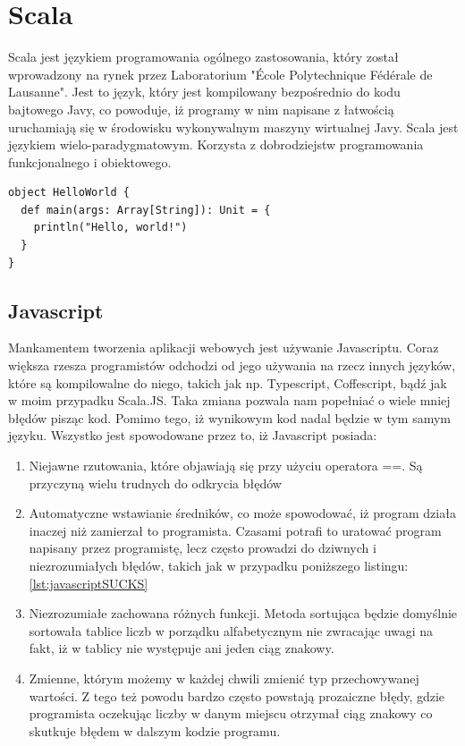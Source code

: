 \newpage
{\let\cleardoublepage\relax \chapter{Scala\cite{ScalaWiki}}}

Scala jest językiem programowania ogólnego zastosowania, który został wprowadzony na rynek przez Laboratorium "École Polytechnique Fédérale de Lausanne". Jest to język, który jest kompilowany bezpośrednio do kodu bajtowego Javy, co powoduje, iż programy w nim napisane z łatwością uruchamiają się w środowisku wykonywalnym maszyny wirtualnej Javy. 
Scala jest językiem wielo-paradygmatowym\cite{ScalaTour}. Korzysta z dobrodziejstw programowania funkcjonalnego i obiektowego.

\begin{lstlisting}[frame=single, numbers=none,captionpos=b, 
caption={Hello world napisany w języku Scala.}]
object HelloWorld {
  def main(args: Array[String]): Unit = {
    println("Hello, world!")
  }
}
\end{lstlisting}

\section{Javascript}

Mankamentem tworzenia aplikacji webowych jest używanie Javascriptu. Coraz większa rzesza programistów odchodzi od jego używania na rzecz innych języków, które są kompilowalne do niego, takich jak np. Typescript, Coffescript, bądź jak w moim przypadku Scala.JS. Taka zmiana pozwala nam popełniać o wiele mniej błędów pisząc kod. Pomimo tego, iż wynikowym kod nadal będzie w tym samym języku.
Wszystko jest spowodowane przez to, iż Javascript posiada:
\begin{enumerate}
	\item Niejawne rzutowania, które objawiają się przy użyciu operatora ==. Są przyczyną wielu trudnych do odkrycia błędów
	\item Automatyczne wstawianie średników, co może spowodować, iż program działa inaczej niż zamierzał to programista. Czasami potrafi to uratować program napisany przez programistę, lecz często prowadzi do dziwnych i niezrozumiałych błędów, takich jak w przypadku poniższego listingu: \ref{lst:javascriptSUCKS}
	\item Niezrozumiałe zachowana różnych funkcji. Metoda sortująca będzie domyślnie sortowała tablice liczb w porządku alfabetycznym nie zwracając uwagi na fakt, iż w tablicy nie występuje ani jeden ciąg znakowy.
	\item Zmienne, którym możemy w każdej chwili zmienić typ przechowywanej wartości. Z tego też powodu bardzo często powstają prozaiczne błędy, gdzie programista oczekując liczby w danym miejscu otrzymał ciąg znakowy co skutkuje błędem w dalszym kodzie programu.
\end{enumerate}

